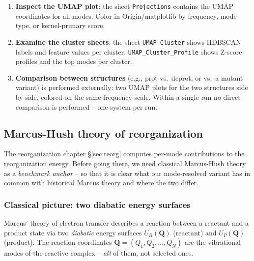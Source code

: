 \documentclass[11pt,a4paper,twoside]{article}
\theoremstyle{remark}
\begin{document}
\begin{enumerate}
  \item \textbf{Inspect the UMAP plot}: the sheet
        \texttt{Projections} contains the UMAP coordinates for all
        modes. Color in Origin/matplotlib by frequency, mode type,
        or kernel-primary score.

  \item \textbf{Examine the cluster sheets}: the sheet
        \texttt{UMAP\_Cluster} shows HDBSCAN labels and feature
        values per cluster. \texttt{UMAP\_Cluster\_Profile}
        shows Z-score profiles and the top modes per cluster.

  \item \textbf{Comparison between structures} (e.g., prot vs.\
        deprot, or vs.\ a mutant variant) is performed externally:
        two UMAP plots for the two structures side by side, colored
        on the same frequency scale. Within a single run no direct
        comparison is performed -- one system per run.
\end{enumerate}




\subsection{Marcus-Hush theory of reorganization}
\label{sec:marcus-hush}

The reorganization chapter \S\ref{sec:reorg} computes per-mode
contributions to the reorganization energy. Before going there, we
need classical Marcus-Hush theory as a \emph{benchmark anchor} -- so
that it is clear what our mode-resolved variant has in common with
historical Marcus theory and where the two differ.

\subsubsection*{Classical picture: two diabatic energy surfaces}

Marcus' theory of electron transfer \cite{Marcus1956,Marcus1993}
describes a reaction between a reactant and a product state via two
\emph{diabatic} energy surfaces $U_R(\mathbf{Q})$ (reactant) and
$U_P(\mathbf{Q})$ (product). The reaction coordinates
$\mathbf{Q} = (Q_1, Q_2, \ldots, Q_N)$ are the vibrational modes of
the reactive complex -- \emph{all} of them, not selected ones.
\end{document}
